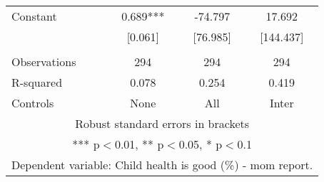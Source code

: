\begin{tabular}{lccc}
Constant & 0.689*** & -74.797 & 17.692 \\
 & [0.061] & [76.985] & [144.437] \\
 &  &  &  \\
Observations & 294 & 294 & 294 \\
R-squared & 0.078 & 0.254 & 0.419 \\
 Controls & None & All & Inter \\ \hline
\multicolumn{4}{c}{ Robust standard errors in brackets} \\
\multicolumn{4}{c}{ *** p$<$0.01, ** p$<$0.05, * p$<$0.1} \\
\multicolumn{4}{c}{ Dependent variable: Child health is good (\%) - mom report.} \\
\end{tabular}
